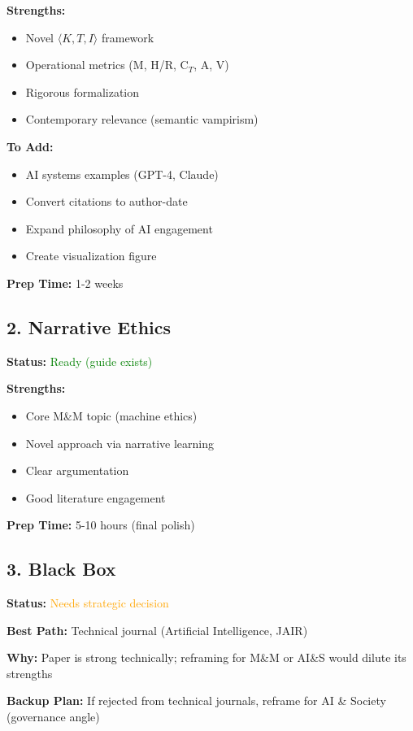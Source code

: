 \documentclass[12pt]{article}
\begin{document}
\textbf{Strengths:}
\begin{itemize}[itemsep=0pt]
\item Novel $\langle K, T, I \rangle$ framework
\item Operational metrics (M, H/R, C$_T$, A, V)
\item Rigorous formalization
\item Contemporary relevance (semantic vampirism)
\end{itemize}

\textbf{To Add:}
\begin{itemize}[itemsep=0pt]
\item AI systems examples (GPT-4, Claude)
\item Convert citations to author-date
\item Expand philosophy of AI engagement
\item Create visualization figure
\end{itemize}

\textbf{Prep Time:} 1-2 weeks

\subsection*{2. Narrative Ethics}

\textbf{Status:} \textcolor{green}{Ready (guide exists)}

\textbf{Strengths:}
\begin{itemize}[itemsep=0pt]
\item Core M\&M topic (machine ethics)
\item Novel approach via narrative learning
\item Clear argumentation
\item Good literature engagement
\end{itemize}

\textbf{Prep Time:} 5-10 hours (final polish)

\subsection*{3. Black Box}

\textbf{Status:} \textcolor{orange}{Needs strategic decision}

\textbf{Best Path:} Technical journal (Artificial Intelligence, JAIR)

\textbf{Why:} Paper is strong technically; reframing for M\&M or AI\&S would dilute its strengths

\textbf{Backup Plan:} If rejected from technical journals, reframe for AI \& Society (governance angle)
\end{document}
